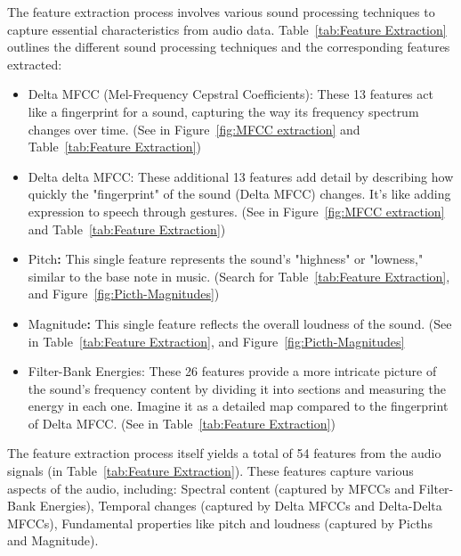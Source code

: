 \documentclass[conference, 10pt,onecolumn]{IEEEtran}
\begin{document}
The feature extraction process involves various sound processing techniques to capture essential characteristics from audio data. Table~\ref{tab:Feature Extraction} outlines the different sound processing techniques and the corresponding features extracted:
\begin{itemize}
    \item Delta MFCC (Mel-Frequency Cepstral Coefficients): These 13 features act like a fingerprint for a sound, capturing the way its frequency spectrum changes over time. (See in Figure~\ref{fig:MFCC extraction} and Table~\ref{tab:Feature Extraction})
    \item Delta delta MFCC: These additional 13 features add detail by describing how quickly the "fingerprint" of the sound (Delta MFCC) changes. It's like adding expression to speech through gestures. (See in Figure~\ref{fig:MFCC extraction} and Table~\ref{tab:Feature Extraction})
    \item Pitch\textbf{:} This single feature represents the sound's "highness" or "lowness," similar to the base note in music. (Search for Table~\ref{tab:Feature Extraction}, and Figure~\ref{fig:Picth-Magnitudes})
    \item Magnitude\textbf{:} This single feature reflects the overall loudness of the sound. (See in Table~\ref{tab:Feature Extraction}, and Figure~\ref{fig:Picth-Magnitudes} 
    \item Filter-Bank Energies: These 26 features provide a more intricate picture of the sound's frequency content by dividing it into sections and measuring the energy in each one. Imagine it as a detailed map compared to the fingerprint of Delta MFCC. (See in Table~\ref{tab:Feature Extraction})
\end{itemize}

The feature extraction process itself yields a total of 54 features from the audio signals (in Table~\ref{tab:Feature Extraction}). These features capture various aspects of the audio, including: Spectral content (captured by MFCCs and Filter-Bank Energies), Temporal changes (captured by Delta MFCCs and Delta-Delta MFCCs), Fundamental properties like pitch and loudness (captured by Picths and Magnitude).
\end{document}
